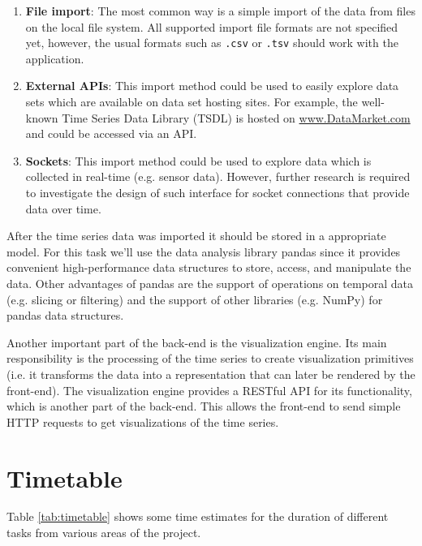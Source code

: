 \documentclass[12pt, a4paper]{article}
\begin{document}
\begin{enumerate}
 \item \textbf{File import}: The most common way is a simple import of the data from files on the local file system.
 All supported import file formats are not specified yet, however, the usual formats such as \texttt{.csv} or \texttt{.tsv} should work with the application.
 \item \textbf{External APIs}: This import method could be used to easily explore data sets which are available on data set hosting sites. 
 For example, the well-known Time Series Data Library (TSDL) is hosted on \url{www.DataMarket.com} and could be accessed via an API. 
 \item \textbf{Sockets}: This import method could be used to explore data which is collected in real-time (e.g. sensor data). 
 However, further research is required to investigate the design of such interface for socket connections that provide data over time.
\end{enumerate}

After the time series data was imported it should be stored in a appropriate model. 
For this task we'll use the data analysis library pandas since it provides convenient high-performance data structures to store, access, and manipulate the data.
Other advantages of pandas are the support of operations on temporal data (e.g. slicing or filtering) and the support of other libraries (e.g. NumPy) for pandas data structures.

Another important part of the back-end is the visualization engine. 
Its main responsibility is the processing of the time series to create visualization primitives (i.e. it transforms the data into a representation that can later be rendered by the front-end).
The visualization engine provides a RESTful API for its functionality, which is another part of the back-end.
This allows the front-end to send simple HTTP requests to get visualizations of the time series.



\section{Timetable}

Table \ref{tab:timetable} shows some time estimates for the duration of different tasks from various areas of the project. 
\end{document}
